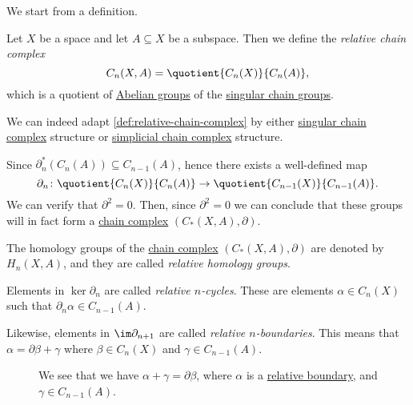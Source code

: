 We start from a definition.
\begin{definition}\label{def:relative-chain-complex}
	Let $X$ be a space and let $A \subseteq X$ be a subspace. Then we define the \emph{relative chain complex}
	\[
		C_n(X, A) = \quotient{C_n(X)}{C_n(A)},
	\]
	which is a quotient of \hyperref[def:Abelian-group]{Abelian groups} of the \hyperref[def:singular-chain]{singular chain groups}.
\end{definition}
\begin{remark}
	We can indeed adapt \autoref{def:relative-chain-complex} by either \hyperref[def:singular-chain]{singular chain complex}
	structure or \hyperref[def:simplicial-complex]{simplicial chain complex} structure.
\end{remark}

\begin{exercise}
	Since \(\partial^\ast_n(C_{n} (A))\subseteq C_{n-1}(A) \), hence there exists a well-defined map
	\[
		\partial_n\colon \quotient{C_{n} (X)}{C_{n} (A)} \to \quotient{C_{n-1} (X)}{C_{n-1}(A)}.
	\]
	We can verify that \(\partial^{2} =0\). Then, since $\partial^2 = 0$ we can conclude that these groups will in fact form a
	\hyperref[def:chain-complex]{chain complex} $(C_\ast(X, A), \partial)$.
\end{exercise}

\begin{definition}\label{def:relative-homology}
	The homology groups of the \hyperref[def:chain-complex]{chain complex} \((C_\ast(X, A), \partial)\) are denoted
	by $H_n(X, A)$, and they are called \emph{relative homology groups}.

	Elements in $\ker \partial_n$ are called \emph{relative $n$-cycles}\label{def:relative-cycle}. These are elements $\alpha \in C_n(X)$
	such that $\partial_n\alpha \in C_{n - 1}(A)$.
	\begin{figure}[H]
		\centering
		\label{fig:def:relative-homology-1}
	\end{figure}

	Likewise, elements in $\im \partial_{n + 1}$ are called \emph{relative $n$-boundaries}\label{def:relative-boundary}.
	This means that $\alpha = \partial \beta + \gamma$ where $\beta \in C_n(X)$ and $\gamma \in C_{n - 1}(A)$.
	\begin{figure}[H]
		\centering
		\caption{We see that we have \(\alpha +\gamma =\partial \beta \), where \(\alpha \) is a \hyperref[def:relative-boundary]{relative boundary},
			and \(\gamma \in C_{n-1}(A)\).}
		\label{fig:def:relative-homology-2}
	\end{figure}
\end{definition}

